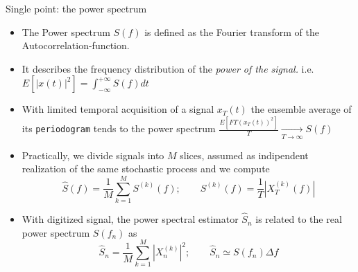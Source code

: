 \documentclass[t,10pt]{beamer}
\begin{document}
\begin{frame}{Single point: the power spectrum}
\begin{itemize}[<+->]
\item The \textcolor{ta3skyblue}{Power spectrum $S(f)$} is defined as the
  Fourier transform of the Autocorrelation-function.
\item It describes the frequency distribution of the \emph{power of
    the signal.} i.e.
  $E[|x(t)|^2]=\int_{-\infty}^{+\infty}S(f)dt$
\item With limited temporal acquisition of a signal $x_T(t)$
  the ensemble average of its \textcolor{ta3skyblue}{\texttt{periodogram}}
  tends to the power spectrum
  $\frac{E[FT(x_T(t)) ^2]}{T}\xrightarrow[T\rightarrow \infty]{} S(f)$
\item Practically, we divide
  signals into $M$ slices, assumed as indipendent realization of the
  same stochastic process and we compute
\begin{equation*}
\hat{S}(f) = \frac{1}{M}\sum_{k=1}^{M} S^{(k)}(f) ; \qquad S^{(k)}(f)=\frac{1}{T}|X_T^{(k)}(f)|
\end{equation*}
\item With digitized signal, the power spectral estimator $\hat{S}_n$
  is related to the real power spectrum $S(f_n)$ as 
\begin{equation*}
\hat{S}_n = \frac{1}{M}\sum_{k=1}^{M}|X_n^{(k)}|^2; \qquad \hat{S}_n
\simeq S(f_n)\Delta f
\end{equation*}
\end{itemize}
\end{frame}
\end{document}
